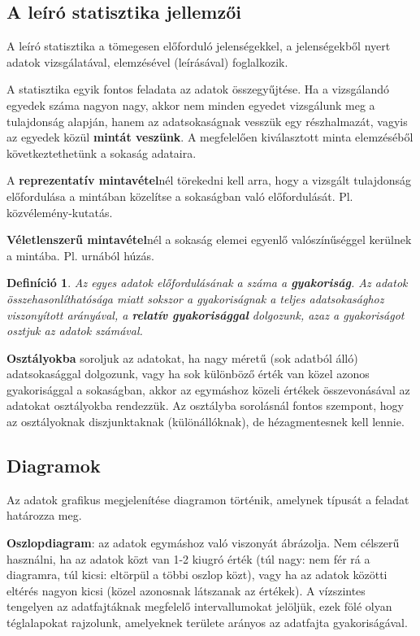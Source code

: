 \documentclass[12pt,a4paper]{article}
\newtheorem{definition}{Definíció} [section]
\begin{document}
\subsection{A leíró statisztika jellemzői}
A leíró statisztika a tömegesen előforduló jelenségekkel, a jelenségekből nyert adatok vizsgálatával, elemzésével (leírásával) foglalkozik.

A statisztika egyik fontos feladata az adatok összegyűjtése. Ha a vizsgálandó egyedek száma nagyon nagy, akkor nem minden egyedet vizsgálunk meg a tulajdonság alapján, hanem az adatsokaságnak vesszük egy részhalmazát, vagyis az egyedek közül \textbf{mintát veszünk}. A megfelelően kiválasztott minta elemzéséből következtethetünk a sokaság adataira.

A \textbf{reprezentatív mintavétel}nél törekedni kell arra, hogy a vizsgált tulajdonság előfordulása a mintában közelítse a sokaságban való előfordulását. Pl. közvélemény-kutatás.

\textbf{Véletlenszerű mintavétel}nél a sokaság elemei egyenlő valószínűséggel kerülnek a mintába. Pl. urnából húzás.

\begin{definition}
Az egyes adatok előfordulásának a száma a \textbf{gyakoriság}. Az adatok összehasonlíthatósága miatt sokszor a gyakoriságnak a teljes adatsokasághoz viszonyított arányával, a \textbf{relatív gyakorisággal} dolgozunk, azaz a gyakoriságot osztjuk az adatok számával.
\end{definition}

\textbf{Osztályokba} soroljuk az adatokat, ha nagy méretű (sok adatból álló) adatsokasággal dolgozunk, vagy ha sok különböző érték van közel azonos gyakorisággal a sokaságban, akkor az egymáshoz közeli értékek összevonásával az adatokat osztályokba rendezzük. Az osztályba sorolásnál fontos szempont, hogy az osztályoknak diszjunktaknak (különállóknak), de hézagmentesnek kell lennie.

\subsection{Diagramok}
Az adatok grafikus megjelenítése diagramon történik, amelynek típusát a feladat határozza meg.

\textbf{Oszlopdiagram}: az adatok egymáshoz való viszonyát ábrázolja. Nem célszerű használni, ha az adatok közt van 1-2 kiugró érték (túl nagy: nem fér rá a diagramra, túl kicsi: eltörpül a többi oszlop közt), vagy ha az adatok közötti eltérés nagyon kicsi (közel azonosnak látszanak az értékek). A vízszintes tengelyen az adatfajtáknak megfelelő intervallumokat jelöljük, ezek fölé olyan téglalapokat rajzolunk, amelyeknek területe arányos az adatfajta gyakoriságával.
\end{document}

